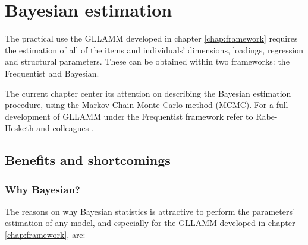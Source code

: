 \chapter{Bayesian estimation } \label{chap:estimation}

The practical use the GLLAMM developed in chapter \ref{chap:framework} requires the estimation of all of the items and individuals' dimensions, loadings, regression and structural parameters. These can be obtained within two frameworks: the Frequentist and Bayesian. 

The current chapter center its attention on describing the Bayesian estimation procedure, using the Markov Chain Monte Carlo method (MCMC). For a full development of GLLAMM under the Frequentist framework refer to Rabe-Hesketh and colleagues \cite{Rabe_et_al_2004a, Rabe_et_al_2004b, Skrondal_et_al_2004a, Rabe_et_al_2012}.


\section{Benefits and shortcomings}

\subsection{Why Bayesian?}

The reasons on why Bayesian statistics is attractive to perform the parameters' estimation of any model, and especially for the GLLAMM developed in chapter \ref{chap:framework}, are:

